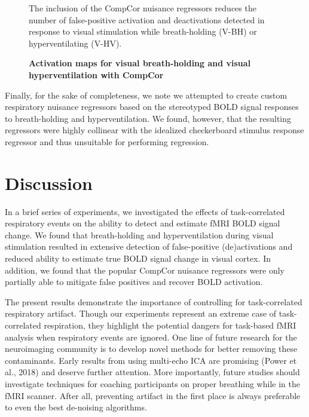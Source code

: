 \documentclass[9pt]{NEU502b-fmri}
\begin{document}
\begin{figure}
\centerline{%
%
}
\caption{\textbf{Activation maps for visual breath-holding and visual hyperventilation with CompCor}}
\par The inclusion of the CompCor nuisance regressors reduces the number of false-positive activation and deactivations detected in response to visual stimulation while breath-holding (V-BH) or hyperventilating (V-HV). 

\end{figure}
Finally, for the sake of completeness, we note we attempted to create custom respiratory nuisance regressors based on the stereotyped BOLD signal responses to breath-holding and hyperventilation. We found, however, that the resulting regressors were highly collinear with the idealized checkerboard stimulus response regressor and thus unsuitable for performing regression.

\section{Discussion}
In a brief series of experiments, we investigated the effects of task-correlated respiratory events on the ability to detect and estimate fMRI BOLD signal change. We found that breath-holding and hyperventilation during visual stimulation resulted in extensive detection of false-positive (de)activations and reduced ability to estimate true BOLD signal change in visual cortex. In addition, we found that the popular CompCor nuisance regressors were only partially able to mitigate false positives and recover BOLD activation. 

The present results demonstrate the importance of controlling for task-correlated respiratory artifact. Though our experiments represent an extreme case of task-correlated respiration, they highlight the potential dangers for task-based fMRI analysis when respiratory events are ignored. One line of future research for the neuroimaging community is to develop novel methods for better removing these contaminants. Early results from using multi-echo ICA are promising (Power et al., 2018) and deserve further attention. More importantly, future studies should investigate techniques for coaching participants on proper breathing while in the fMRI scanner. After all, preventing artifact in the first place is always preferable to even the best de-noising algorithms. 
\end{document}
